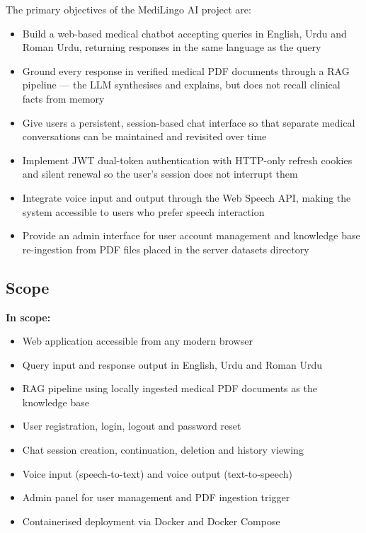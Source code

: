 The primary objectives of the MediLingo AI project are:

\begin{itemize}
  \item Build a web-based medical chatbot accepting queries in English, Urdu and Roman Urdu,
        returning responses in the same language as the query
  \item Ground every response in verified medical PDF documents through a RAG pipeline ---
        the LLM synthesises and explains, but does not recall clinical facts from memory
  \item Give users a persistent, session-based chat interface so that separate medical
        conversations can be maintained and revisited over time
  \item Implement JWT dual-token authentication with HTTP-only refresh cookies and silent
        renewal so the user's session does not interrupt them
  \item Integrate voice input and output through the Web Speech API, making the system
        accessible to users who prefer speech interaction
  \item Provide an admin interface for user account management and knowledge base
        re-ingestion from PDF files placed in the server datasets directory
\end{itemize}

\subsection{Scope}

\textbf{In scope:}
\begin{itemize}
  \item Web application accessible from any modern browser
  \item Query input and response output in English, Urdu and Roman Urdu
  \item RAG pipeline using locally ingested medical PDF documents as the knowledge base
  \item User registration, login, logout and password reset
  \item Chat session creation, continuation, deletion and history viewing
  \item Voice input (speech-to-text) and voice output (text-to-speech)
  \item Admin panel for user management and PDF ingestion trigger
  \item Containerised deployment via Docker and Docker Compose
\end{itemize}

